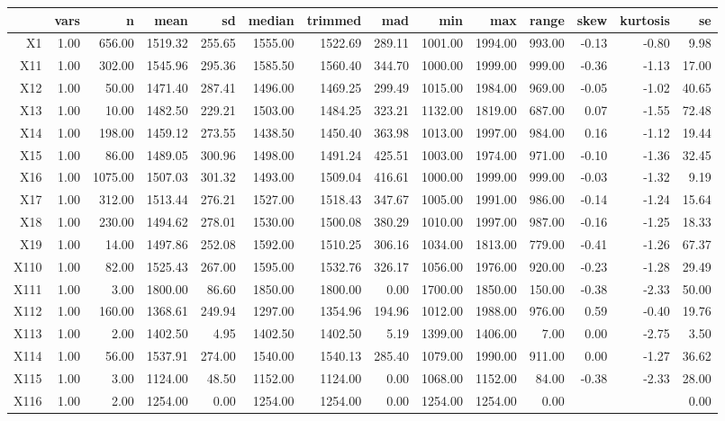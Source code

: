 % 
\begin{tabular}{rrrrrrrrrrrrrr}
  \hline
 & vars & n & mean & sd & median & trimmed & mad & min & max & range & skew & kurtosis & se \\ 
  \hline
X1 & 1.00 & 656.00 & 1519.32 & 255.65 & 1555.00 & 1522.69 & 289.11 & 1001.00 & 1994.00 & 993.00 & -0.13 & -0.80 & 9.98 \\ 
  X11 & 1.00 & 302.00 & 1545.96 & 295.36 & 1585.50 & 1560.40 & 344.70 & 1000.00 & 1999.00 & 999.00 & -0.36 & -1.13 & 17.00 \\ 
  X12 & 1.00 & 50.00 & 1471.40 & 287.41 & 1496.00 & 1469.25 & 299.49 & 1015.00 & 1984.00 & 969.00 & -0.05 & -1.02 & 40.65 \\ 
  X13 & 1.00 & 10.00 & 1482.50 & 229.21 & 1503.00 & 1484.25 & 323.21 & 1132.00 & 1819.00 & 687.00 & 0.07 & -1.55 & 72.48 \\ 
  X14 & 1.00 & 198.00 & 1459.12 & 273.55 & 1438.50 & 1450.40 & 363.98 & 1013.00 & 1997.00 & 984.00 & 0.16 & -1.12 & 19.44 \\ 
  X15 & 1.00 & 86.00 & 1489.05 & 300.96 & 1498.00 & 1491.24 & 425.51 & 1003.00 & 1974.00 & 971.00 & -0.10 & -1.36 & 32.45 \\ 
  X16 & 1.00 & 1075.00 & 1507.03 & 301.32 & 1493.00 & 1509.04 & 416.61 & 1000.00 & 1999.00 & 999.00 & -0.03 & -1.32 & 9.19 \\ 
  X17 & 1.00 & 312.00 & 1513.44 & 276.21 & 1527.00 & 1518.43 & 347.67 & 1005.00 & 1991.00 & 986.00 & -0.14 & -1.24 & 15.64 \\ 
  X18 & 1.00 & 230.00 & 1494.62 & 278.01 & 1530.00 & 1500.08 & 380.29 & 1010.00 & 1997.00 & 987.00 & -0.16 & -1.25 & 18.33 \\ 
  X19 & 1.00 & 14.00 & 1497.86 & 252.08 & 1592.00 & 1510.25 & 306.16 & 1034.00 & 1813.00 & 779.00 & -0.41 & -1.26 & 67.37 \\ 
  X110 & 1.00 & 82.00 & 1525.43 & 267.00 & 1595.00 & 1532.76 & 326.17 & 1056.00 & 1976.00 & 920.00 & -0.23 & -1.28 & 29.49 \\ 
  X111 & 1.00 & 3.00 & 1800.00 & 86.60 & 1850.00 & 1800.00 & 0.00 & 1700.00 & 1850.00 & 150.00 & -0.38 & -2.33 & 50.00 \\ 
  X112 & 1.00 & 160.00 & 1368.61 & 249.94 & 1297.00 & 1354.96 & 194.96 & 1012.00 & 1988.00 & 976.00 & 0.59 & -0.40 & 19.76 \\ 
  X113 & 1.00 & 2.00 & 1402.50 & 4.95 & 1402.50 & 1402.50 & 5.19 & 1399.00 & 1406.00 & 7.00 & 0.00 & -2.75 & 3.50 \\ 
  X114 & 1.00 & 56.00 & 1537.91 & 274.00 & 1540.00 & 1540.13 & 285.40 & 1079.00 & 1990.00 & 911.00 & 0.00 & -1.27 & 36.62 \\ 
  X115 & 1.00 & 3.00 & 1124.00 & 48.50 & 1152.00 & 1124.00 & 0.00 & 1068.00 & 1152.00 & 84.00 & -0.38 & -2.33 & 28.00 \\ 
  X116 & 1.00 & 2.00 & 1254.00 & 0.00 & 1254.00 & 1254.00 & 0.00 & 1254.00 & 1254.00 & 0.00 &  &  & 0.00 \\ 
   \hline
\end{tabular}

